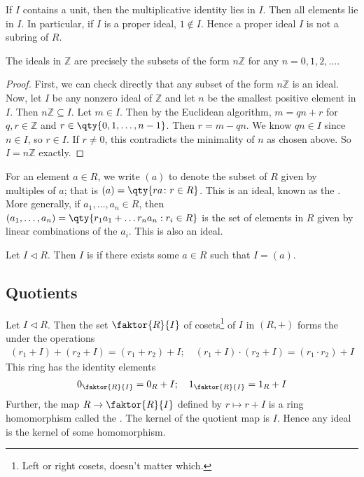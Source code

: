 \begin{remark}
	If $I$ contains a unit, then the multiplicative identity lies in $I$.
	Then all elements lie in $I$.
	In particular, if $I$ is a proper ideal, $1 \not\in I$.
	Hence a proper ideal $I$ is not a subring of $R$.
\end{remark}

\begin{lemma} \label{lem:8.3}
	The ideals in $\mathbb Z$ are precisely the subsets of the form $n\mathbb Z$ for any $n = 0, 1, 2, \dots$.
\end{lemma}

\begin{proof}
	First, we can check directly that any subset of the form $n\mathbb Z$ is an ideal.
	Now, let $I$ be any nonzero ideal of $\mathbb Z$ and let $n$ be the smallest positive element in $I$.
	Then $n\mathbb Z \subseteq I$.
	Let $m \in I$.
	Then by the Euclidean algorithm, $m = qn+r$ for $q,r \in \mathbb Z$ and $r \in \qty{0, 1, \dots, n-1}$.
	Then $r = m - qn$.
	We know $qn \in I$ since $n \in I$, so $r \in I$.
	If $r \neq 0$, this contradicts the minimality of $n$ as chosen above.
	So $I = n\mathbb Z$ exactly.
\end{proof}


\begin{definition}
	For an element $a \in R$, we write $(a)$ to denote the subset of $R$ given by multiples of $a$; that is $(a) = \qty{ra \colon r\in R}$.
	This is an ideal, known as the .
	More generally, if $a_1, \dots, a_n \in R$, then $(a_1, \dots, a_n) = \qty{r_1 a_1 + \dots r_n a_n : r_i \in R}$ is the set of elements in $R$ given by linear combinations of the $a_i$.
	This is also an ideal.
\end{definition}

\begin{definition}
	Let $I \triangleleft R$.
	Then $I$ is  if there exists some $a \in R$ such that $I = (a)$.
\end{definition}

\subsection{Quotients}
\begin{theorem} \label{thm:8.4}
	Let $I \triangleleft R$.
	Then the set $\faktor{R}{I}$ of cosets\footnote{Left or right cosets, doesn't matter which.} of $I$ in $(R, +)$ forms the  under the operations
	\begin{align*}
		(r_1 + I) + (r_2 + I) = (r_1 + r_2) + I;\quad (r_1 + I) \cdot (r_2 + I) = (r_1 \cdot r_2) + I
	\end{align*}
	This ring has the identity elements
	\begin{align*}
		0_{\faktor{R}{I}} = 0_R + I;\quad 1_{\faktor{R}{I}} = 1_R + I
	\end{align*}
	Further, the map $R \to \faktor{R}{I}$ defined by $r \mapsto r + I$ is a ring homomorphism called the .
	The kernel of the quotient map is $I$.
	Hence any ideal is the kernel of some homomorphism.
\end{theorem}


